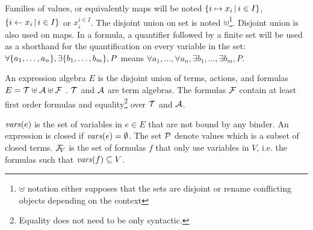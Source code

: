\documentclass[runningheads]{llncs}
\begin{document}

Families of values, or equivalently maps will be noted \(\mset{i \mapsto x_i}{i \in I}\), \(\mset{i \gets x_i}{i \in I}\) or \(x_i^{i \in I}\). %
The disjoint union on set is noted \(\uplus\)\footnote{\(\uplus\) notation either supposes that the sets are disjoint or rename conflicting objects depending on the context}. Disjoint union is also used on maps.
In a formula, a quantifier followed by a finite set will be used as a shorthand for the quantification on every variable in the set:
\(\forall \mbrc{a_1, \dots, a_n}, \exists \mbrc{b_1, \dots, b_m}, P\) means \(\forall a_1, \dots, \forall a_n, \exists b_1, \dots, \exists b_m, P\).

An expression algebra \(E\) is the disjoint union  of  terms,  actions, and  formulas
\( E=\terms \uplus \actions \uplus \formulas\) .
\(\terms\) and \(\actions\) are term algebras.
The formulas \(\formulas\) contain at least first order formulas and equality\footnote{Equality does not need to be only syntactic.} over \(\terms\) and \(\actions\). 

 \(\fvars{e}\) is the set of variables in \(e \in E\) that are not bound by any binder. An expression is closed if \(\fvars{e}=\emptyset\).
The set \(\values\) denote values which is a subset of closed terms. \(\rformulas[V]\) is the set of formulas $f$ that only use variables in $V$, i.e. the formulas such that  \(\fvars{f}\subseteq V\).
\end{document}
